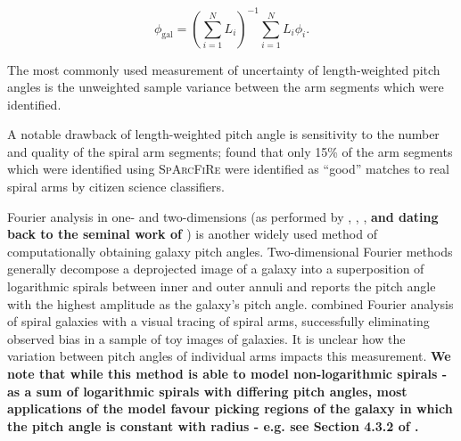 \begin{equation}
  \phi_\mathrm{gal} = \left(\sum_{i=1}^{N}L_i\right)^{-1}\sum_{i=1}^{N}L_i \phi_i.
\end{equation}

The most commonly used measurement of uncertainty of length-weighted pitch angles is the unweighted sample variance between the arm segments which were identified.

A notable drawback of length-weighted pitch angle is sensitivity to the number and quality of the spiral arm segments; \citet{2017MNRAS.472.2263H} found that only 15\% of the arm segments which were identified using \textsc{SpArcFiRe} \citep{2014ApJ...790...87D} were identified as ``good'' matches to real spiral arms by citizen science classifiers.

Fourier analysis in one- and two-dimensions (as performed by \citealt{2019arXiv190804246D}, \citealt{2012ApJS..199...33D}, \citealt{2018MNRAS.474.2594M}, \textbf{and dating back to the seminal work of \citealt{ConsidereAthanassoula1988}}) is another widely used method of computationally obtaining galaxy pitch angles. Two-dimensional Fourier methods generally decompose a deprojected image of a galaxy into a superposition of logarithmic spirals between inner and outer annuli \citep{2012ApJS..199...33D} and reports the pitch angle with the highest amplitude as the galaxy's pitch angle. \citet{2020MNRAS.493.3854H} combined Fourier analysis of spiral galaxies with a visual tracing of spiral arms, successfully eliminating observed bias in a sample of toy images of galaxies. It is unclear how the variation between pitch angles of individual arms impacts this measurement. \textbf{We note that while this method is able to model non-logarithmic spirals - as a sum of logarithmic spirals with differing pitch angles, most applications of the model favour picking regions of the galaxy in which the pitch angle is constant with radius - e.g. see Section 4.3.2 of \citealt{2012ApJS..199...33D}.}


